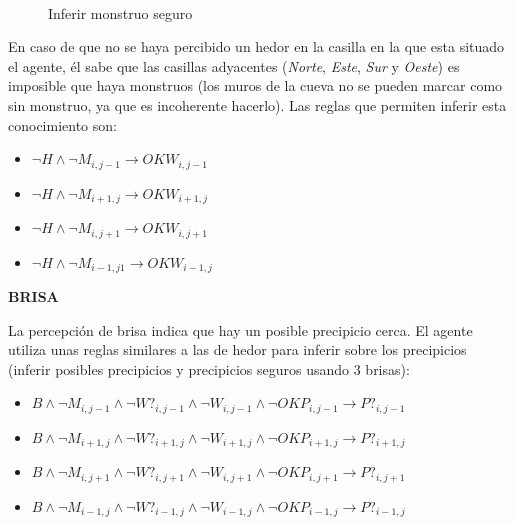\begin{figure}[htb]
\centering
  \hspace{1em}
  \\
  \hspace{1em}
  \caption{Inferir monstruo seguro}\label{fig:inferir_monstruo}
\end{figure}
\FloatBarrier

En caso de que no se haya percibido un hedor en la casilla en la que esta situado el agente, él sabe que las casillas adyacentes (\emph{Norte}, \emph{Este}, \emph{Sur} y \emph{Oeste}) es imposible que haya monstruos (los muros de la cueva no se pueden marcar como sin monstruo, ya que es incoherente hacerlo). Las reglas que permiten inferir esta conocimiento son:

\begin{itemize}
    \item $\neg H \land \neg M_{i, j-1} \longrightarrow OKW_{i, j-1}$
    \item $\neg H \land \neg M_{i+1, j} \longrightarrow OKW_{i+1, j}$
    \item $\neg H \land \neg M_{i, j+1} \longrightarrow OKW_{i, j+1}$
    \item $\neg H \land \neg M_{i-1, j1} \longrightarrow OKW_{i-1, j}$
\end{itemize}

\newpage
\centerline{\textbf{BRISA}}

La percepción de brisa indica que hay un posible precipicio cerca. El agente utiliza unas reglas similares a las de hedor para inferir sobre los precipicios (inferir posibles precipicios y precipicios seguros usando 3 brisas):

\begin{itemize}
    \item $B \land \neg M_{i, j-1} \land \neg W?_{i, j-1} \land \neg W_{i, j-1} \land \neg OKP_{i, j-1} \longrightarrow P?_{i, j-1}$
    \item $B \land \neg M_{i+1, j} \land \neg W?_{i+1, j} \land \neg W_{i+1, j} \land \neg OKP_{i+1, j} \longrightarrow P?_{i+1, j}$
    \item $B \land \neg M_{i, j+1} \land \neg W?_{i, j+1} \land \neg W_{i, j+1} \land \neg OKP_{i, j+1} \longrightarrow P?_{i, j+1}$
    \item $B \land \neg M_{i-1, j} \land \neg W?_{i-1, j} \land \neg W_{i-1, j} \land \neg OKP_{i-1, j} \longrightarrow P?_{i-1, j}$
\end{itemize}

